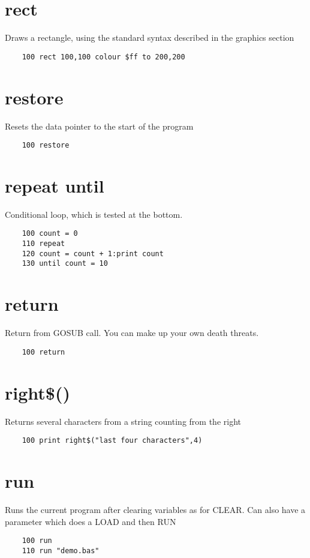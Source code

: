 \section*{rect}
Draws a rectangle, using the standard syntax described in the graphics section
\example{}
\begin{verbatim}
	100 rect 100,100 colour $ff to 200,200
\end{verbatim}

\section*{restore}
Resets the data pointer to the start of the program
\example{}
\begin{verbatim}
	100 restore
\end{verbatim}

\section*{repeat until}
Conditional loop, which is tested at the bottom.
\example{}
\begin{verbatim}
	100 count = 0
	110 repeat
	120 count = count + 1:print count
	130 until count = 10
\end{verbatim}

\section*{return}
Return from GOSUB call. You can make up your own death threats.
\example{}
\begin{verbatim}
	100 return
\end{verbatim}

\section*{right\$()}
Returns several characters from a string counting from the right
\example{}
\begin{verbatim}
	100 print right$("last four characters",4)
\end{verbatim}

\section*{run}
Runs the current program after clearing variables as for CLEAR. Can also have a parameter which does a LOAD and then RUN
\example{}
\begin{verbatim}
	100 run
	110 run "demo.bas"
\end{verbatim}

